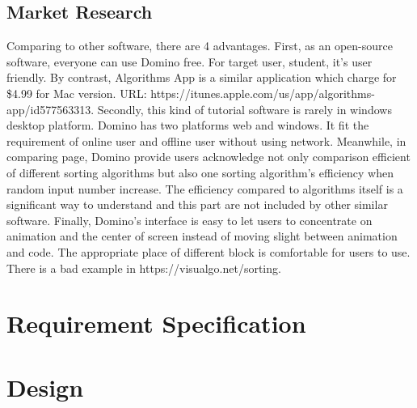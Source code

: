 \documentclass[paper=a4, fontsize=11pt,twoside]{scrartcl}		%
\begin{document}
\subsection{Market Research}
Comparing to other software, there are 4 advantages. First, as an open-source software, everyone can use Domino free. For target user, student, it’s user friendly. By contrast, Algorithms App is a similar application which charge for \$4.99 for Mac version. URL: https://itunes.apple.com/us/app/algorithms-app/id577563313. Secondly, this kind of tutorial software is rarely in windows desktop platform. Domino has two platforms web and windows. It fit the requirement of online user and offline user without using network. Meanwhile, in comparing page, Domino provide users acknowledge not only comparison efficient of different sorting algorithms but also one sorting algorithm’s efficiency when random input number increase. The efficiency compared to algorithms itself is a significant way to understand and this part are not included by other similar software. Finally, Domino’s interface is easy to let users to concentrate on animation and the center of screen instead of moving slight between animation and code. The appropriate place of different block is comfortable for users to use. There is a bad example in https://visualgo.net/sorting.

\section{Requirement Specification}
\clearpage

\section{Design}
\end{document}
